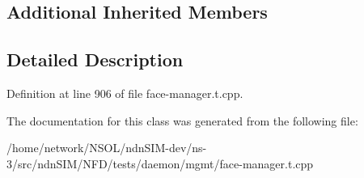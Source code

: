 \subsection*{Additional Inherited Members}


\subsection{Detailed Description}


Definition at line 906 of file face-\/manager.\+t.\+cpp.



The documentation for this class was generated from the following file\+:\begin{DoxyCompactItemize}
\item 
/home/network/\+N\+S\+O\+L/ndn\+S\+I\+M-\/dev/ns-\/3/src/ndn\+S\+I\+M/\+N\+F\+D/tests/daemon/mgmt/face-\/manager.\+t.\+cpp\end{DoxyCompactItemize}

